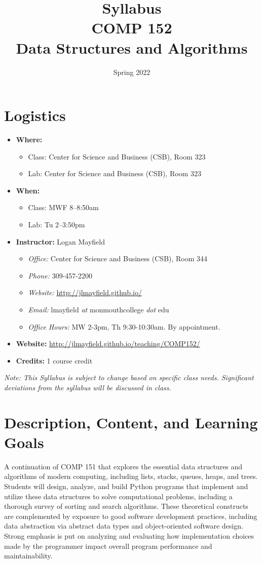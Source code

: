\documentclass[10pt]{article}
\title{Syllabus \\ COMP 152 \\ Data Structures and Algorithms}
\author{  }
\date{Spring 2022}
\begin{document}
\maketitle

\section{Logistics}
\begin{itemize}
\item \textbf{Where: }
\begin{itemize}
\item Class: Center for Science and Business (CSB), Room 323
\item Lab: Center for Science and Business (CSB), Room 323
\end{itemize}
\item \textbf{When: }
\begin{itemize}
  \item Class: MWF 8--8:50am
  \item Lab: Tu 2--3:50pm
\end{itemize}
\item \textbf{Instructor: } Logan Mayfield
\begin{itemize}
\item \textit{Office: } Center for Science and Business (CSB), Room 344
\item \textit{Phone: } 309-457-2200 %
\item \textit{Website: } \url{http://jlmayfield.github.io/}
\item \textit{Email: } lmayfield \textit{at} monmouthcollege \textit{dot} edu
\item \textit{Office Hours: }  MW 2-3pm, Th 9:30-10:30am. By appointment.
\end{itemize}
\item \textbf{Website: } \url{http://jlmayfield.github.io/teaching/COMP152/}
\item \textbf{Credits: } 1 course credit
\end{itemize}
\emph{Note: This Syllabus is subject to change based on specific class needs. Significant deviations from the syllabus will be discussed in class.}


\section{Description, Content, and Learning Goals}

A continuation of COMP 151 that explores the essential data structures
and algorithms of modern computing, including lists, stacks, queues,
heaps, and trees. Students will design, analyze, and build Python
programs that implement and utilize these data structures to solve
computational problems, including a thorough survey of sorting and
search algorithms. These theoretical constructs are complemented by
exposure to good software development practices, including data
abstraction via abstract data types and object-oriented software
design. Strong emphasis is put on analyzing and evaluating how
implementation choices made by the programmer impact overall program
performance and maintainability.
\end{document}
